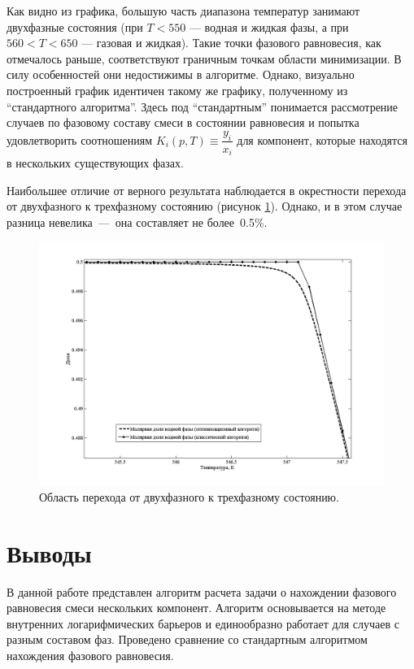 \documentclass[12pt]{article}
\begin{document}
Как видно из графика, большую часть диапазона температур занимают двухфазные состояния (при $T<550$ --- водная и жидкая фазы, а при $560<T<650$ --- газовая и жидкая). Такие точки фазового равновесия, как отмечалось раньше, соответствуют граничным точкам области минимизации. В силу особенностей они недостижимы в алгоритме. Однако, визуально построенный график идентичен такому же графику, полученному из ``стандартного алгоритма''. Здесь под ``стандартным'' понимается рассмотрение случаев по фазовому составу смеси в состоянии равновесия и попытка удовлетворить соотношениям $K_i(p,T) \equiv \dfrac{y_i}{x_i}$ для компонент, которые находятся в нескольких существующих фазах.

Наибольшее отличие от верного результата наблюдается в окрестности перехода от двухфазного к трехфазному состоянию (рисунок \ref{fig:2}). Однако, и в этом случае разница невелика~---~она составляет не более~0.5\%.

\begin{figure}
	\centering
	\includegraphics[width=\textwidth]{Figure2.png}
	\caption{Область перехода от двухфазного к трехфазному состоянию.}
	\label{fig:2}
\end{figure}

\section{Выводы}
В данной работе представлен алгоритм расчета задачи о нахождении фазового равновесия смеси нескольких компонент. Алгоритм основывается на методе внутренних логарифмических барьеров и единообразно работает для случаев с разным составом фаз. Проведено сравнение со стандартным алгоритмом нахождения фазового равновесия.
\end{document}

